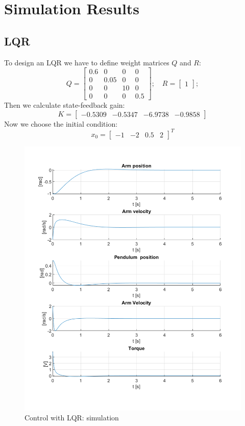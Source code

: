 \chapter{Simulation Results}
\section{LQR}
To design an LQR we have to define weight matrices $Q$ and $R$:
\begin{equation}
	Q = \begin{bmatrix}
	0.6&0&0&0\\
	0&0.05&0&0\\
	0&0&10&0\\
	0&0&0&0.5
	\end{bmatrix}; \quad R = \begin{bmatrix}1\end{bmatrix};
\end{equation}
Then we calculate state-feedback gain:
\begin{equation}
	K = \begin{bmatrix}-0.5309&-0.5347&-6.9738&-0.9858\end{bmatrix}
\end{equation}
Now we choose the initial condition:
\begin{equation}
	x_0 = \begin{bmatrix}
	-1&-2&0.5&2
	\end{bmatrix}^T
\end{equation}
\begin{figure}[h]
	\centering
	\includegraphics[width=.6\linewidth]{images/LQR}
	\caption{Control with LQR: simulation}
	\label{lqr}
\end{figure}
\newpage
